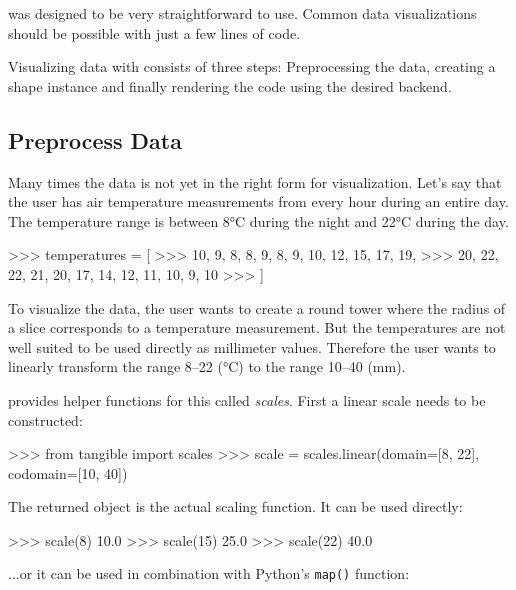 \tangible{} was designed to be very straightforward to use. Common data
visualizations should be possible with just a few lines of code.

Visualizing data with \tangible{} consists of three steps: Preprocessing the
data, creating a shape instance and finally rendering the code using the desired
backend.

\subsection{Preprocess Data}

Many times the data is not yet in the right form for visualization. Let's say
that the user has air temperature measurements from every hour during an entire
day. The temperature range is between 8\si{\degree}C during the night and
22\si{\degree}C during the day.

\vspace{.5\baselineskip}
\begin{pythoncode}
>>> temperatures = [
>>>     10, 9, 8, 8, 9, 8, 9, 10, 12, 15, 17, 19,
>>>     20, 22, 22, 21, 20, 17, 14, 12, 11, 10, 9, 10
>>> ]
\end{pythoncode}

\noindent To visualize the data, the user wants to create a round tower where
the radius of a slice corresponds to a temperature measurement. But the
temperatures are not well suited to be used directly as millimeter values.
Therefore the user wants to linearly transform the range 8--22 (\si{\degree}C)
to the range 10--40 (mm).

\tangible{} provides helper functions for this called \emph{scales}. First a
linear scale needs to be constructed:

\vspace{.5\baselineskip}
\begin{pythoncode}
>>> from tangible import scales
>>> scale = scales.linear(domain=[8, 22], codomain=[10, 40])
\end{pythoncode}

\noindent The returned object is the actual scaling function. It can be used directly:

\vspace{.5\baselineskip}
\begin{pythoncode}
>>> scale(8)
10.0
>>> scale(15)
25.0
>>> scale(22)
40.0
\end{pythoncode}

\noindent ...or it can be used in combination with Python's \texttt{map()}
function:

